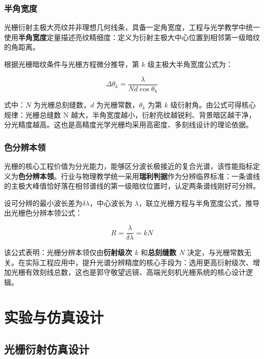 \documentclass[12pt,a4paper]{ctexrep}
\begin{document}
\subsection{半角宽度}

光栅衍射主极大亮纹并非理想几何线条，具备一定角宽度，工程与光学教学中统一使用\textbf{半角宽度}定量描述亮纹精细度：定义为衍射主极大中心位置到相邻第一级暗纹的角距离。

根据光栅暗纹条件与光栅方程微分推导，第 $k$ 级主极大半角宽度公式为：

\begin{equation*}
\Delta\theta_k=\frac{\lambda}{Nd\cos\theta_k}
\end{equation*}

式中：$N$ 为光栅总刻缝数，$d$ 为光栅常数，$\theta_k$ 为第 $k$ 级衍射角。由公式可得核心规律：光栅总缝数 N 越大，半角宽度越小，衍射亮纹越锐利、背景暗区越干净，分光精度越高。这也是高精度光学光栅均采用高密度、多刻线设计的理论依据。

\subsection{色分辨本领}

光栅的核心工程价值为分光能力，能够区分波长极接近的复合光谱，该性能指标定义为\textbf{色分辨本领}。行业与物理教学统一采用\textbf{瑞利判据}作为分辨临界标准：一条谱线的主极大峰值恰好落在相邻谱线的第一级暗纹位置时，认定两条谱线刚好可分辨。

设可分辨的最小波长差为$\delta\lambda$，中心波长为 $\lambda$，联立光栅方程与半角宽度公式，推导出光栅色分辨本领公式：

\begin{equation*}
R=\frac{\lambda}{\delta\lambda}=kN
\end{equation*}

该公式表明：光栅分辨本领仅由\textbf{衍射级次 $k$} 和\textbf{总刻缝数 $N$} 决定，与光栅常数无关。在实际工程应用中，提升光谱分辨精度的核心手段为：选用更高衍射级次、增加光栅有效刻线总数，这也是郭守敬望远镜、高端光刻机光栅系统的核心设计逻辑。

\chapter{实验与仿真设计}

\section{光栅衍射仿真设计}
\end{document}
